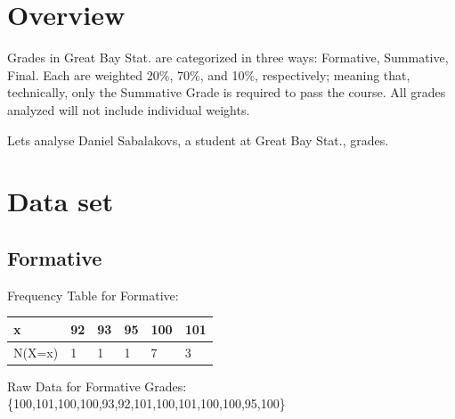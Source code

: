 \documentclass[letterpaper]{article}
\newcommand{\titleDOC}{}
\newcommand{\authorDOC}{Daniel Sabalakov}
\newcommand{\classDOC}{}
\newcommand{\quoteDOC}{``\textit{Truth is ever to be found in the simplicity, and not in the multiplicity and confusion of things}'' - Issac Newton}
\begin{document}








\renewcommand{\quoteDOC}{``\textit{May the Force Be With You}'' \\ \textemdash{} General Jan Dodonna}

\renewcommand{\classDOC}{DE Introduction to Probability and Statistics, Portsmouth High School}

\renewcommand{\titleDOC}{Q1 Grade Analysis}

\renewcommand{\authorDOC}{Daniel Sabalakov}



\section*{Overview}\label{overview}

Grades in Great Bay Stat. are categorized in three ways: Formative, Summative, Final. Each are weighted 20\%, 70\%, and 10\%, respectively; meaning that, technically, only the Summative Grade is required to pass the course. All grades analyzed will not include individual weights.

Let\textquotesingle s analyse Daniel Sabalakov\textquotesingle s, a student at Great Bay Stat., grades.

\section*{Data set}\label{data-set}

\subsection*{Formative}\label{formative}

Frequency Table for Formative:

\begin{longtable}[]{@{}llllll@{}}
\toprule\noalign{}
x & 92 & 93 & 95 & 100 & 101 \\
\midrule\noalign{}
\endhead
\bottomrule\noalign{}
\endlastfoot
N(X=x) & 1 & 1 & 1 & 7 & 3 \\
\end{longtable}

Raw Data for Formative Grades:
\{100,101,100,100,93,92,101,100,101,100,100,95,100\}
\end{document}
